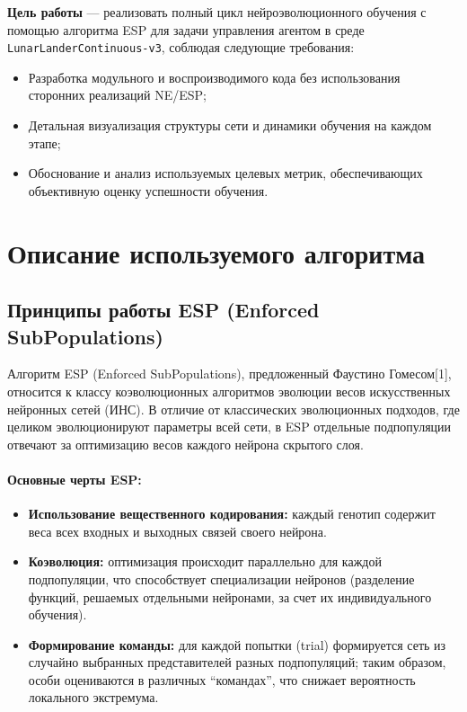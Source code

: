 \documentclass[a4paper,12pt]{article}
\begin{document}
\textbf{Цель работы} — реализовать полный цикл нейроэволюционного обучения с помощью алгоритма ESP для задачи управления агентом в среде \texttt{LunarLanderContinuous-v3}, соблюдая следующие требования:
\begin{itemize}
	\item Разработка модульного и воспроизводимого кода без использования сторонних реализаций NE/ESP;
	\item Детальная визуализация структуры сети и динамики обучения на каждом этапе;
	\item Обоснование и анализ используемых целевых метрик, обеспечивающих объективную оценку успешности обучения.
\end{itemize}

\newpage
\section{Описание используемого алгоритма}

\subsection{Принципы работы ESP (Enforced SubPopulations)}
Алгоритм ESP (Enforced SubPopulations), предложенный Фаустино Гомесом[1], относится к классу коэволюционных алгоритмов эволюции весов искусственных нейронных сетей (ИНС). В отличие от классических эволюционных подходов, где целиком эволюционируют параметры всей сети, в ESP отдельные подпопуляции отвечают за оптимизацию весов каждого нейрона скрытого слоя.

\paragraph{Основные черты ESP:}
\begin{itemize}
	\item \textbf{Использование вещественного кодирования:} каждый генотип содержит веса всех входных и выходных связей своего нейрона.
	\item \textbf{Коэволюция:} оптимизация происходит параллельно для каждой подпопуляции, что способствует специализации нейронов (разделение функций, решаемых отдельными нейронами, за счет их индивидуального обучения).
	\item \textbf{Формирование команды:} для каждой попытки (trial) формируется сеть из случайно выбранных представителей разных подпопуляций; таким образом, особи оцениваются в различных ``командах'', что снижает вероятность локального экстремума.
\end{itemize}
\end{document}
